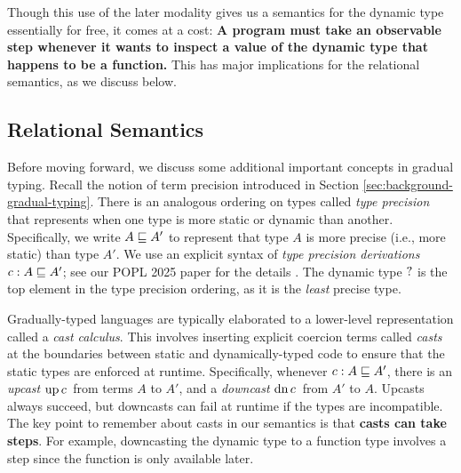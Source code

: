 \documentclass{article}
\theoremstyle{definition}
\theoremstyle{remark}
\begin{document}
Though this use of the later modality gives us a semantics for the dynamic type
essentially for free, it comes at a cost: \textbf{A program must take an
observable step whenever it wants to inspect a value of the dynamic type that
happens to be a function.} This has major implications for the relational
semantics, as we discuss below.


\subsection{Relational Semantics}


Before moving forward, we discuss some additional important concepts in gradual
typing. Recall the notion of term precision introduced in Section
\ref{sec:background-gradual-typing}. There is an analogous ordering on types
called \emph{type precision} that represents when one type is more static or
dynamic than another. Specifically, we write $A \sqsubseteq A'$ to represent that
type $A$ is more precise (i.e., more static) than type $A'$. We use an explicit
syntax of \emph{type precision derivations} $c : A \sqsubseteq A'$; see our POPL 2025
paper for the details \cite{gtt-sgdt}. The dynamic type ${?}$ is the top
element in the type precision ordering, as it is the \emph{least} precise type.

Gradually-typed languages are typically elaborated to a lower-level
representation called a \emph{cast calculus}. This involves inserting explicit
coercion terms called \emph{casts} at the boundaries between static and
dynamically-typed code to ensure that the static types are enforced at runtime.
Specifically, whenever $c : A \sqsubseteq A'$, there is an \emph{upcast} $\text{up}\,{c}\,$
from terms $A$ to $A'$, and a \emph{downcast} $\text{dn}\,{c}\,$ from $A'$ to $A$. Upcasts
always succeed, but downcasts can fail at runtime if the types are incompatible.
%
%
The key point to remember about casts in our semantics is that
\textbf{casts can take steps}. For example, downcasting the dynamic type to a
function type involves a step since the function is only available later.
\end{document}
